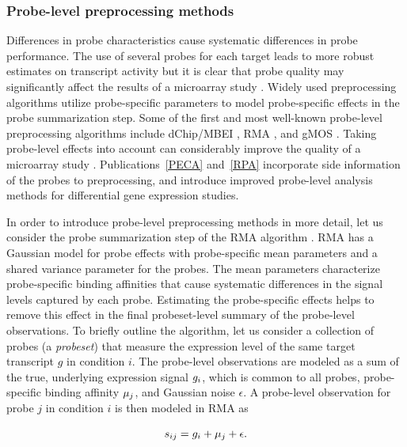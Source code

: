 \subsubsection{Probe-level preprocessing methods}

Differences in probe characteristics cause systematic differences in
probe performance.  The use of several probes for each target leads to
more robust estimates on transcript activity but it is clear that
probe quality may significantly affect the results of a microarray
study \citep{Irizarry03}. Widely used preprocessing algorithms utilize
probe-specific parameters to model probe-specific effects in the probe
summarization step. Some of the first and most well-known probe-level 
preprocessing algorithms include dChip/MBEI \citep{Li01mbei}, RMA \citep{Irizarry03rma}, and
gMOS \citep{Milo03}. Taking probe-level effects into account can
considerably improve the quality of a microarray study
\citep{Reimers2010}. Publications~\ref{PECA} and~\ref{RPA} incorporate
side information of the probes to preprocessing, and introduce
improved probe-level analysis methods for differential gene expression
studies.

In order to introduce probe-level preprocessing methods in more
detail, let us consider the probe summarization step of the RMA
algorithm \citep{Irizarry03rma}. RMA has a Gaussian model for probe
effects with probe-specific mean parameters and a shared variance
parameter for the probes.  The mean parameters characterize
probe-specific binding affinities that cause systematic differences in
the signal levels captured by each probe. Estimating the
probe-specific effects helps to remove this effect in the final
probeset-level summary of the probe-level observations. To briefly
outline the algorithm, let us consider a collection of probes (a {\it
  probeset}) that measure the expression level of the same target
transcript \(g\) in condition \(i\). The probe-level observations are
modeled as a sum of the true, underlying expression signal \(g_i\),
which is common to all probes, probe-specific binding affinity
\(\mathbf{\mu}_j\), and Gaussian noise \(\epsilon\). A probe-level observation
for probe \(j\) in condition \(i\) is then modeled in RMA as

\begin{equation}\label{eq:rmamodel}
  s_{ij} = g_i + \mathbf{\mu}_j + \epsilon.
\end{equation} 

